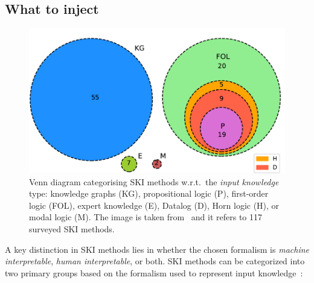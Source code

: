 \subsection{What to inject}\label{subsec:what-to-inject}
%
\begin{figure}
    \centering
    \includegraphics[width=.6\linewidth]{figures/ski-logic}
    \caption[Venn diagram categorising SKI methods w.r.t. the input knowledge]{
        Venn diagram categorising SKI methods w.r.t.\ the \emph{input knowledge} type: knowledge graphs (KG), propositional logic (P), first-order logic (FOL), expert knowledge (E), Datalog (D), Horn logic (H), or modal logic (M).
        The image is taken from~\cite{DBLP:journals/csur/CiattoSAMO24} and it refers to 117 surveyed \gls{SKI} methods.
    }
    \label{fig:pie-ski-logic}
\end{figure}
%
%
A key distinction in \gls{SKI} methods lies in whether the chosen formalism is \emph{machine interpretable}, \emph{human interpretable}, or both.
%
\Gls{SKI} methods can be categorized into two primary groups based on the formalism used to represent input knowledge~\cite{DBLP:journals/csur/CiattoSAMO24}:
%

